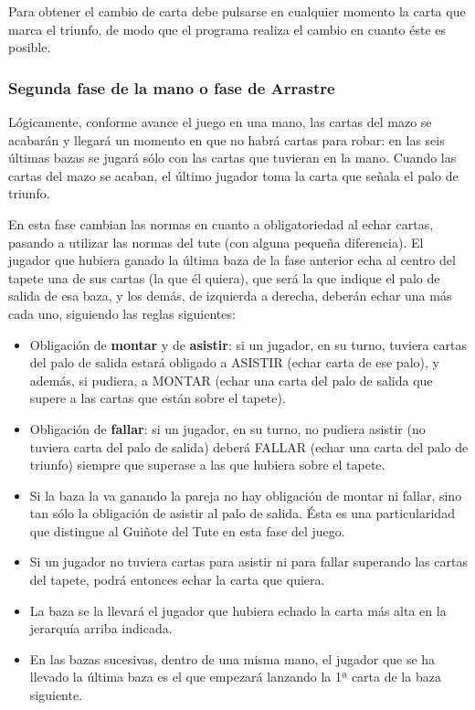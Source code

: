 \documentclass{article}
\begin{document}
Para obtener el cambio de carta debe pulsarse en cualquier momento la carta que marca el triunfo, de modo que el programa realiza el cambio en cuanto éste es posible.

\subsubsection*{Segunda fase de la mano o fase de Arrastre}

Lógicamente, conforme avance el juego en una mano, las cartas del mazo se acabarán y llegará un momento en que no habrá cartas para robar: en las seis últimas bazas se jugará sólo con las cartas que tuvieran en la mano. Cuando las cartas del mazo se acaban, el último jugador toma la carta que señala el palo de triunfo.

En esta fase cambian las normas en cuanto a obligatoriedad al echar cartas, pasando a utilizar las normas del tute (con alguna pequeña diferencia). El jugador que hubiera ganado la última baza de la fase anterior echa al centro del tapete una de sus cartas (la que él quiera), que será la que indique el palo de salida de esa baza, y los demás, de izquierda a derecha, deberán echar una más cada uno, siguiendo las reglas siguientes:

\begin{itemize}
	\item Obligación de \textbf{montar} y de \textbf{asistir}: si un jugador, en su turno, tuviera cartas del palo de salida estará obligado a ASISTIR (echar carta de ese palo), y además, si pudiera, a MONTAR (echar una carta del palo de salida que supere a las cartas que están sobre el tapete).
	\item Obligación de \textbf{fallar}: si un jugador, en su turno, no pudiera asistir (no tuviera carta del palo de salida) deberá FALLAR (echar una carta del palo de triunfo) siempre que superase a las que hubiera sobre el tapete.
	\item Si la baza la va ganando la pareja no hay obligación de montar ni fallar, sino tan sólo la obligación de asistir al palo de salida. Ésta es una particularidad que distingue al Guiñote del Tute en esta fase del juego.
	\item Si un jugador no tuviera cartas para asistir ni para fallar superando las cartas del tapete, podrá entonces echar la carta que quiera.
	\item La baza se la llevará el jugador que hubiera echado la carta más alta en la jerarquía arriba indicada.
	\item En las bazas sucesivas, dentro de una misma mano, el jugador que se ha llevado la última baza es el que empezará lanzando la 1ª carta de la baza siguiente.
\end{itemize}
\end{document}
